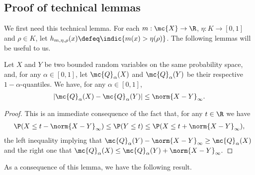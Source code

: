 \subsection{Proof of technical lemmas}
\label{sec:technical-lemmas}
We first need this technical lemma. 
For each $m : \mc{X} \to \R$, $\eta: K \to [0,1]$ and $\rho \in K$, let $h_{m,\eta, \rho}(x) \defeq \indic{ m(x) > \eta(\rho)}$. 
The following lemmas will be useful to us.
\begin{lemma}
\label{lem:quantile-infty-norm}
Let $X$ and $Y$ be two bounded random variables on the same probability space, and, for any $\alpha \in [0,1]$, let $\mc{Q}_{\alpha}(X)$ and $\mc{Q}_{\alpha}(Y)$ be their respective $1-\alpha$-quantiles.  We have, for any $\alpha \in [0,1]$,
\begin{align*}
\left| \mc{Q}_{\alpha}(X) - \mc{Q}_{\alpha}(Y)\right| \le \norm{X-Y}_\infty.
\end{align*}
\end{lemma}
\begin{proof}
This is an immediate consequence of the fact that, for any $t \in \R$ we have
\begin{align*}
\P( X \le t - \norm{X-Y}_\infty ) \le \P(Y \le t) \le \P(X \le t + \norm{X-Y}_\infty),
\end{align*}
the left inequality implying that
$
\mc{Q}_\alpha(Y) - \norm{X-Y}_\infty \ge \mc{Q}_\alpha(X) 
$
and the right one that
$
\mc{Q}_\alpha(X) \le \mc{Q}_\alpha(Y) + \norm{X-Y}_\infty.
$
\end{proof}
As a consequence of this lemma, we have the following result.

